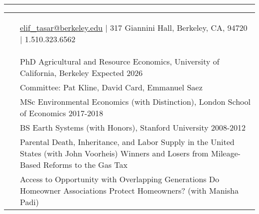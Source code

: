 \documentclass[letterpaper,10pt,oneside]{article}
\newenvironment{myresume}[2]{\pdfbookmark{#1}{#1}{\LARGE{\textbf{#1}}}\vspace{1mm}\hrule\vspace{-2mm}\begin{longtable}{p{0.12\textwidth} p{0.8\textwidth}}&#2}{\end{longtable}}
\renewcommand{\section}[2]{\vspace{-1.5em}\\\pdfbookmark{#1}{#2}{\singlespace\textsc{#1}}&}
\newcommand{\firstentry}[1]{\vspace{0em}\newline#1\vspace{0em}}
\newcommand{\entry}[1]{\vspace{-1em}\\~&#1}
\begin{document}

\begin{myresume}{}
\smallskip
\begin{center}
    \vspace{-2em}\hspace{-7em} \href{mailto: elif_tasar@berkeley.edu}{elif\_tasar@berkeley.edu} $\vert$ 317 Giannini Hall, Berkeley, CA, 94720 $\vert$ 1.510.323.6562 \vspace{-2em}
\end{center}

\bigskip
\bigskip


\section{Education}{education}

\firstentry{
PhD Agricultural and Resource Economics, University of California, Berkeley \hfill Expected 2026
}

\entry{Committee: Pat Kline, David Card, Emmanuel Saez}

\entry{MSc Environmental Economics (with Distinction), London School of Economics \hfill 2017-2018
}

\entry{
BS Earth Systems (with Honors), Stanford University \hfill 2008-2012
}


\section{Working \newline Papers}{wps}
\firstentry{[1] Parental Death, Inheritance, and Labor Supply in the United States (with John Voorheis)
\newline [2] Winners and Losers from Mileage-Based Reforms to the Gas Tax 
}

\vspace{1.5em}

\section{Work in \newline Progress}{wps}
\firstentry{[1] Access to Opportunity with Overlapping Generations 
\newline [2] Do Homeowner Associations Protect Homeowners? (with Manisha Padi)
}


\end{myresume}
\end{document}
